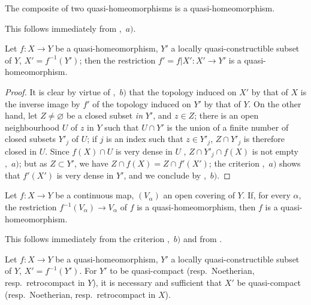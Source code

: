 \begin{corollary}[10.2.3]
\label{IV.10.2.3}
The composite of two quasi-homeomorphisms is a quasi-homeomorphism.
\end{corollary}

This follows immediately from ,~$a)$.

\begin{corollary}[10.2.4]
\label{IV.10.2.4}
Let $f:X\to Y$ be a quasi-homeomorphism, $Y'$ a locally quasi-constructible subset of $Y$, $X'=f^{-1}(Y')$; then the restriction $f'=f|X':X'\to Y'$ is a quasi-homeomorphism.
\end{corollary}

\begin{proof}
It is clear by virtue of ,~$b)$ that the topology induced on $X'$ by that of $X$ is the inverse image by $f'$ of the topology induced on $Y'$ by that of $Y$.
On the other hand,
let $Z\neq\varnothing$ be a closed subset \emph{in} $Y'$, and $z\in Z$; there is an open neighbourhood $U$ of $z$ in $Y$ such that $U\cap Y'$ is the union of a finite number of closed subsets $Y'_j$ of $U$; if $j$ is an index such that $z\in Y'_j$, $Z\cap Y'_j$ is therefore closed in $U$.
Since $f(X)\cap U$ is very dense in $U$ , $Z\cap Y'_j\cap f(X)$ is not empty ,~$a)$; but as $Z\subset Y'$, we have $Z\cap f(X)=Z\cap f'(X')$; the criterion ,~$a)$ shows that $f'(X')$ is very dense in $Y'$, and we conclude by ,~$b)$.
\end{proof}

\begin{corollary}[10.2.5]
\label{IV.10.2.5}
Let $f:X\to Y$ be a continuous map, $(V_\alpha)$ an open covering of $Y$.
If, for every $\alpha$, the restriction $f^{-1}(V_\alpha)\to V_\alpha$ of $f$ is a quasi-homeomorphism, then $f$ is a quasi-homeomorphism.
\end{corollary}

This follows immediately from the criterion ,~$b)$ and from .

\begin{corollary}[10.2.6]
\label{IV.10.2.6}
Let $f:X\to Y$ be a quasi-homeomorphism, $Y'$ a locally quasi-constructible subset of $Y$, $X'=f^{-1}(Y')$.
For $Y'$ to be quasi-compact (resp.\ Noetherian, resp.\ retrocompact in $Y$), it is necessary and sufficient that $X'$ be quasi-compact (resp.\ Noetherian, resp.\ retrocompact in $X$).
\end{corollary}

